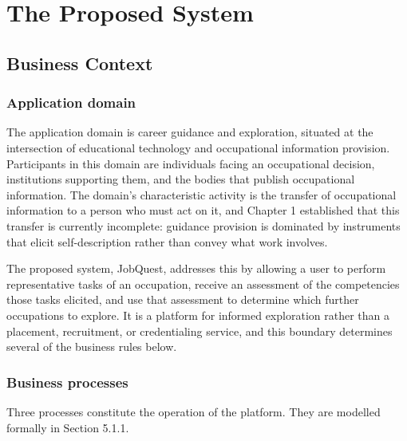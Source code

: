 \newpage
\section{The Proposed System}

\subsection{Business Context}

\subsubsection{Application domain}

The application domain is career guidance and exploration, situated at the intersection of educational technology and occupational information provision. Participants in this domain are individuals facing an occupational decision, institutions supporting them, and the bodies that publish occupational information. The domain's characteristic activity is the transfer of occupational information to a person who must act on it, and Chapter 1 established that this transfer is currently incomplete: guidance provision is dominated by instruments that elicit self-\allowbreak{}description rather than convey what work involves.

The proposed system, JobQuest, addresses this by allowing a user to perform representative tasks of an occupation, receive an assessment of the competencies those tasks elicited, and use that assessment to determine which further occupations to explore. It is a platform for informed exploration rather than a placement, recruitment, or credentialing service, and this boundary determines several of the business rules below.

\subsubsection{Business processes}

Three processes constitute the operation of the platform. They are modelled formally in Section 5.1.1.

